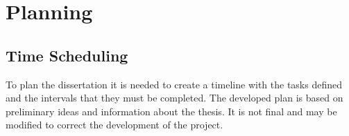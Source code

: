 
%



\chapter{Planning}

\section{Time Scheduling}

    To plan the dissertation it is needed to create a timeline with the tasks defined and the intervals that they must be completed. The developed plan is based on preliminary ideas and information about the thesis. It is not final and may be modified to correct the development of the project.

    